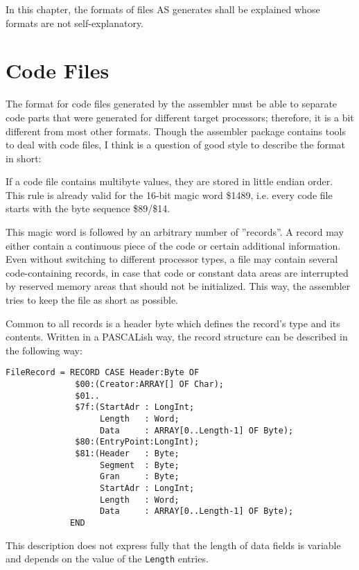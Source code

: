 \documentclass[12pt,twoside]{report}
\newcommand{\tty}[1]{{\tt #1}}
\begin{document}
In this chapter, the formats of files AS generates shall be explained
whose formats are not self-explanatory.


\section{Code Files}
\label{SectCodeFormat}

The format for code files generated by the assembler must be able to
separate code parts that were generated for different target
processors; therefore, it is a bit different from most other formats.
Though the assembler package contains tools to deal with code files,
I think is a question of good style to describe the format in short:

If a code file contains multibyte values, they are stored in little
endian order.  This rule is already valid for the 16-bit magic word
\$1489, i.e. every code file starts with the byte sequence \$89/\$14.

This magic word is followed by an arbitrary number of ''records''.  A
record may either contain a continuous piece of the code or certain
additional information.  Even without switching to different
processor types, a file may contain several code-containing records,
in case that code or constant data areas are interrupted by reserved
memory areas that should not be initialized.  This way, the assembler
tries to keep the file as short as possible.

Common to all records is a header byte which defines the record's type
and its contents.  Written in a PASCALish way, the record structure
can be described in the following way:
\begin{verbatim}
FileRecord = RECORD CASE Header:Byte OF
              $00:(Creator:ARRAY[] OF Char);
              $01..
              $7f:(StartAdr : LongInt;
                   Length   : Word;
                   Data     : ARRAY[0..Length-1] OF Byte);
              $80:(EntryPoint:LongInt);
              $81:(Header   : Byte;
                   Segment  : Byte;
                   Gran     : Byte;
                   StartAdr : LongInt;
                   Length   : Word;
                   Data     : ARRAY[0..Length-1] OF Byte);
             END
\end{verbatim}
This description does not express fully that the length of data
fields is variable and depends on the value of the \tty{Length} entries.
\end{document}
